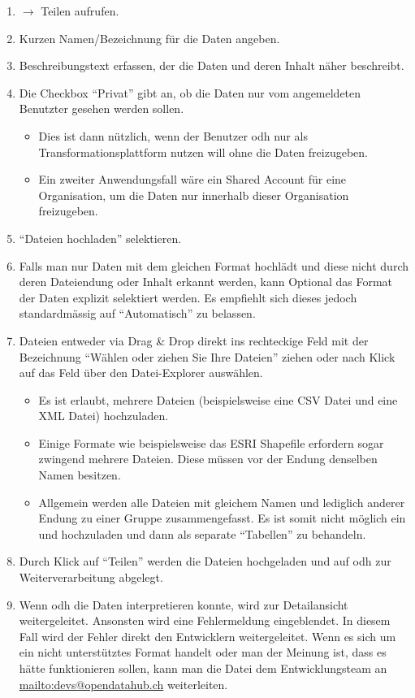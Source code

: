 \begin{enumerate}
\item {} $\to$ Teilen aufrufen.
\item Kurzen Namen/Bezeichnung für die Daten angeben.
\item Beschreibungstext erfassen, der die Daten und deren Inhalt näher beschreibt.
\item Die Checkbox ``Privat'' gibt an, ob die Daten nur vom angemeldeten Benutzter gesehen werden sollen.
	\begin{itemize}
	\item Dies ist dann nützlich, wenn der Benutzer \acl{odh} nur als Transformationsplattform nutzen will ohne die Daten freizugeben.
	\item Ein zweiter Anwendungsfall wäre ein Shared Account für eine Organisation, um die Daten nur innerhalb dieser Organisation freizugeben.
	\end{itemize}
\item ``Dateien hochladen'' selektieren.
\item Falls man nur Daten mit dem gleichen Format hochlädt und diese nicht durch deren Dateiendung oder Inhalt erkannt werden, kann Optional das Format der Daten explizit selektiert werden. Es empfiehlt sich dieses jedoch standardmässig auf ``Automatisch'' zu belassen.
\item Dateien entweder via Drag \& Drop direkt ins rechteckige Feld mit der Bezeichnung ``Wählen oder ziehen Sie Ihre Dateien'' ziehen oder nach Klick auf das Feld über den Datei-Explorer auswählen.
	\begin{itemize}
	\item Es ist erlaubt, mehrere Dateien (beispielsweise eine CSV Datei und eine XML Datei) hochzuladen.
	\item Einige Formate wie beispielsweise das ESRI Shapefile erfordern sogar zwingend mehrere Dateien. Diese müssen vor der Endung denselben Namen besitzen.
	\item Allgemein werden alle Dateien mit gleichem Namen und lediglich anderer Endung zu einer Gruppe zusammengefasst. Es ist somit nicht möglich ein  und  hochzuladen und dann als separate ``Tabellen'' zu behandeln.
	\end{itemize}
\item Durch Klick auf ``Teilen'' werden die Dateien hochgeladen und auf \acl{odh} zur Weiterverarbeitung abgelegt.
\item Wenn \acl{odh} die Daten interpretieren konnte, wird zur Detailansicht weitergeleitet. Ansonsten wird eine Fehlermeldung eingeblendet. In diesem Fall wird der Fehler direkt den Entwicklern weitergeleitet. Wenn es sich um ein nicht unterstütztes Format handelt oder man der Meinung ist, dass es hätte funktionieren sollen, kann man die Datei dem Entwicklungsteam an \url{mailto:devs@opendatahub.ch} weiterleiten.
\end{enumerate}


